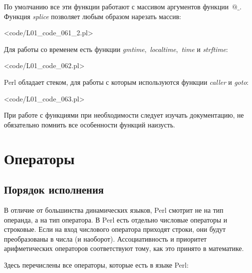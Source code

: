 По умолчанию все эти функции работают с массивом аргументов функции~$@\_$.
Функция \textit{splice} позволяет любым образом нарезать массив:

\pr<code/L01_code_061_2.pl>


Для работы со временем есть функции \textit{gmtime}, \textit{localtime}, \textit{time} и \textit{strftime}:

\pr<code/L01_code_062.pl>

Perl обладает стеком, для работы с которым используются функции \textit{caller} и \textit{goto}:

\pr<code/L01_code_063.pl>

При работе с функциями при необходимости следует изучать документацию, не обязательно помнить все особенности функций наизусть.

\renewcommand{\lasttiming}{4616}
\section{Операторы} %
\subsection{Порядок исполнения}
В отличие от большинства динамических языков, Perl смотрит не на тип операнда, а на тип оператора.
В Perl есть отдельно числовые операторы и строковые.
Если на вход числового оператора приходят строки, они будут преобразованы в числа (и наоборот).
Ассоциативность и приоритет арифметических операторов соответствуют тому, как это принято в математике.

Здесь перечислены все операторы, которые есть в языке Perl:


